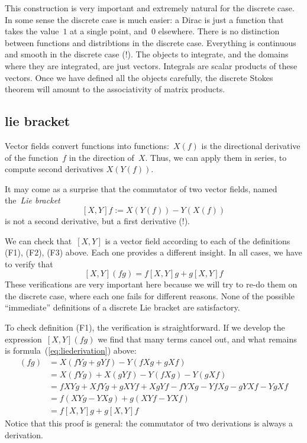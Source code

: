 This construction is very important and extremely natural for the discrete case.
In some sense the discrete case is much easier: a Dirac is just a function
that takes the value~$1$ at a single point, and~$0$ elsewhere.  There is no
distinction between functions and distribtions in the discrete case.
Everything is continuous and smooth in the discrete case (!).
The objects to integrate, and the domains where they are integrated, are just
vectors.
Integrals are
scalar products of these vectors.   Once we have
defined all the objects carefully, the discrete Stokes theorem will amount to
the associativity of matrix products.

\clearpage
\subsection{lie bracket}

Vector fields convert functions into functions:~$X(f)$ is the
directional derivative of the function~$f$ in the direction of~$X$.
Thus, we can apply them in series, to compute second derivatives $X(Y(f))$.

It may come as a surprise that the commutator of two vector fields,
named the~\emph{Lie bracket}
\[
	[X,Y]f := X(Y(f)) - Y(X(f))
\]
is not a second derivative, but a first derivative (!).

We can check that~$[X,Y]$ is a vector field according to each of the
definitions (F1), (F2), (F3) above.  Each one provides a different insight.
In all cases, we have to verify that
\begin{equation}\label{eq:liederivation}
	[X,Y](fg) = f[X,Y]g + g[X,Y]f
\end{equation}
These verifications are very important here because we will try to re-do them
on the discrete case, where each one fails for different reasons.  None of the
possible ``immediate'' definitions of a discrete Lie bracket are
satisfactory.

To check definition (F1), the verification is straightforward. If we develop the
expression~$[X,Y](fg)$ we find that many terms cancel out, and what remains
is formula~(\ref{eq:liederivation}) above:
\begin{align*}
	[X,Y]\left(fg\right) &= X\left(fYg+gYf\right)-Y\left(fXg+gXf\right) \\
	&= X\left(fYg\right)+X\left(gYf\right)-Y\left(fXg\right)-Y\left(gXf\right) \\
	&= fXYg + XfYg + gXYf + XgYf - fYXg - YfXg - gYXf - YgXf\\
	&= f(XYg-YXg) + g(XYf-YXf) \\
	&= f[X,Y]g + g[X,Y]f
\end{align*}
Notice that this proof is general: the commutator of two
derivations is always a derivation.

